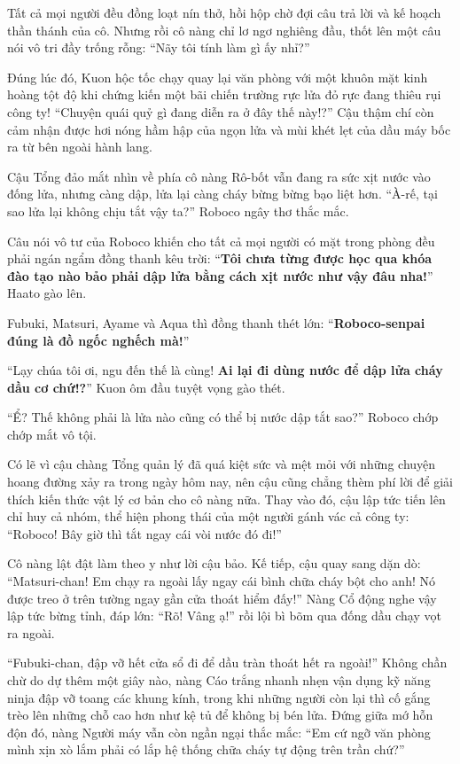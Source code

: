 \documentclass[../main.tex]{subfiles}
\begin{document}
Tất cả mọi người đều đồng loạt nín thở, hồi hộp chờ đợi câu trả lời và kế hoạch thần thánh của cô. Nhưng rồi cô nàng chỉ lơ ngơ nghiêng đầu, thốt lên một câu nói vô tri đầy trống rỗng: ``Nãy tôi tính làm gì ấy nhỉ?''

Đúng lúc đó, Kuon hộc tốc chạy quay lại văn phòng với một khuôn mặt kinh hoàng tột độ khi chứng kiến một bãi chiến trường rực lửa đỏ rực đang thiêu rụi công ty! ``Chuyện quái quỷ gì đang diễn ra ở đây thế này!?'' Cậu thậm chí còn cảm nhận được hơi nóng hầm hập của ngọn lửa và mùi khét lẹt của dầu máy bốc ra từ bên ngoài hành lang.

Cậu Tổng đảo mắt nhìn về phía cô nàng Rô-bốt vẫn đang ra sức xịt nước vào đống lửa, nhưng càng dập, lửa lại càng cháy bừng bừng bạo liệt hơn. ``À-rế, tại sao lửa lại không chịu tắt vậy ta?'' Roboco ngây thơ thắc mắc.

Câu nói vô tư của Roboco khiến cho tất cả mọi người có mặt trong phòng đều phải ngán ngẩm đồng thanh kêu trời: ``\textbf{Tôi chưa từng được học qua khóa đào tạo nào bảo phải dập lửa bằng cách xịt nước như vậy đâu nha!}'' Haato gào lên.

Fubuki, Matsuri, Ayame và Aqua thì đồng thanh thét lớn: ``\textbf{Roboco-senpai đúng là đồ ngốc nghếch mà!}''

``Lạy chúa tôi ơi, ngu đến thế là cùng! \textbf{Ai lại đi dùng nước để dập lửa cháy dầu cơ chứ!?}'' Kuon ôm đầu tuyệt vọng gào thét.

``Ể? Thế không phải là lửa nào cũng có thể bị nước dập tắt sao?'' Roboco chớp chớp mắt vô tội.

Có lẽ vì cậu chàng Tổng quản lý đã quá kiệt sức và mệt mỏi với những chuyện hoang đường xảy ra trong ngày hôm nay, nên cậu cũng chẳng thèm phí lời để giải thích kiến thức vật lý cơ bản cho cô nàng nữa. Thay vào đó, cậu lập tức tiến lên chỉ huy cả nhóm, thể hiện phong thái của một người gánh vác cả công ty: ``Roboco! Bây giờ thì tắt ngay cái vòi nước đó đi!''

Cô nàng lật đật làm theo y như lời cậu bảo. Kế tiếp, cậu quay sang dặn dò: ``Matsuri-chan! Em chạy ra ngoài lấy ngay cái bình chữa cháy bột cho anh! Nó được treo ở trên tường ngay gần cửa thoát hiểm đấy!'' Nàng Cổ động nghe vậy lập tức bừng tỉnh, đáp lớn: ``Rõ! Vâng ạ!'' rồi lội bì bõm qua đống dầu chạy vọt ra ngoài.

``Fubuki-chan, đập vỡ hết cửa sổ đi để dầu tràn thoát hết ra ngoài!'' Không chần chừ do dự thêm một giây nào, nàng Cáo trắng nhanh nhẹn vận dụng kỹ năng ninja đập vỡ toang các khung kính, trong khi những người còn lại thì cố gắng trèo lên những chỗ cao hơn như kệ tủ để không bị bén lửa. Đứng giữa mớ hỗn độn đó, nàng Người máy vẫn còn ngần ngại thắc mắc: ``Em cứ ngỡ văn phòng mình xịn xò lắm phải có lắp hệ thống chữa cháy tự động trên trần chứ?''
\end{document}
